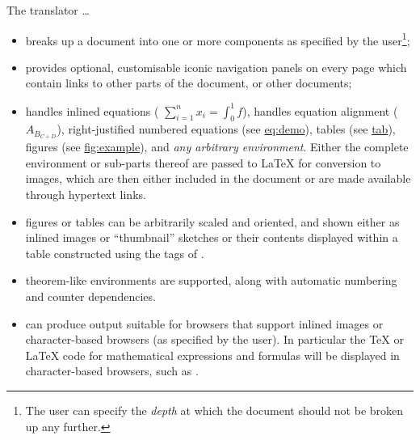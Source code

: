 \smallskip\noindent
The \latextohtml{} translator \dots
%
\begin{itemize}
\item 
breaks up a document into one or more components as specified
by the user\footnote{The user can specify the \emph{depth} at which 
the document should not be broken up any further.};

%
\item 
provides optional, customisable iconic navigation
panels on every page which contain links to other parts of the
document, or other documents;

%
%
%
\item 
handles inlined equations ( \(\sum_{i=1}^{n} x_{i} = \int_{0}^{1} f \)), 
handles equation alignment ($A_{B_{C+D}}$), 
right-justified numbered equations (see \hyperref{example}{equation~}{}{eq:demo}), 
tables (see \hyperref{example}{Table~}{}{tab}), 
figures (see \hyperref{example}{Figure~}{}{fig:example}),
and \emph{any arbitrary environment}.
Either the complete environment or sub-parts thereof\html{\dots}
are passed to \LaTeX{}  for conversion to images, which are then either included
in the document or are made available through hypertext links.

%
%
%
\item 
figures or tables can be arbitrarily scaled and oriented, 
and shown either as inlined images or ``thumbnail'' sketches\html{\dots}
or their contents displayed within a table constructed
using the  tags of \HTMLiii.

%
%
%
%
\item
theorem-like environments are supported, along with
automatic numbering and counter dependencies.

%
%
\item 
can produce output suitable for browsers that support inlined images 
or character-based browsers (as specified by the user).
In particular the \TeX{} or \LaTeX{} code for mathematical expressions
and formulas will be displayed in character-based browsers,
such as .


\end{itemize}
